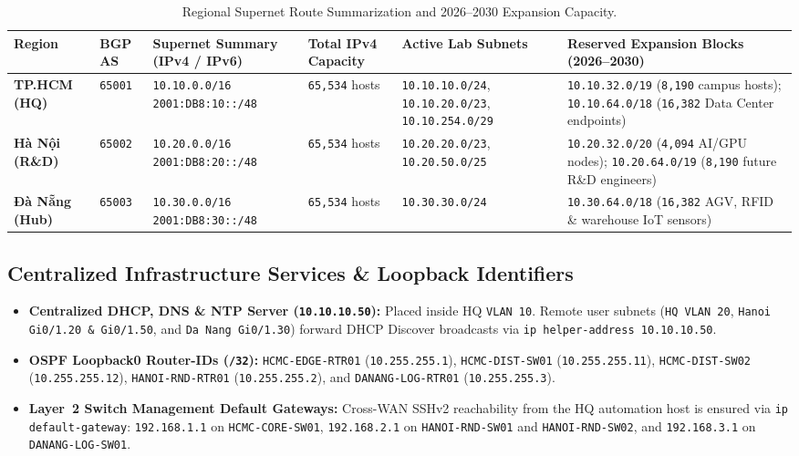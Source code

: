 \begin{table}[H]
\centering
\caption{Regional Supernet Route Summarization and 2026--2030 Expansion Capacity.}
\label{tab:supernet_scaling}
\scriptsize
\setlength{\tabcolsep}{4pt}
\begin{tabularx}{\textwidth}{|p{2.0cm}|p{1.05cm}|p{2.5cm}|p{1.25cm}|p{2.95cm}|X|}
\hline
\textbf{Region} & \textbf{BGP AS} & \textbf{Supernet Summary (IPv4 / IPv6)} & \textbf{Total IPv4 Capacity} & \textbf{Active Lab Subnets} & \textbf{Reserved Expansion Blocks (2026--2030)} \\
\hline
\textbf{TP.HCM (HQ)} & \texttt{65001} & \texttt{10.10.0.0/16} \newline \texttt{2001:DB8:10::/48} & \texttt{65,534} hosts & \texttt{10.10.10.0/24}, \texttt{10.10.20.0/23}, \texttt{10.10.254.0/29} & \texttt{10.10.32.0/19} (\texttt{8,190} campus hosts); \newline \texttt{10.10.64.0/18} (\texttt{16,382} Data Center endpoints) \\
\hline
\textbf{Hà Nội (R\&D)} & \texttt{65002} & \texttt{10.20.0.0/16} \newline \texttt{2001:DB8:20::/48} & \texttt{65,534} hosts & \texttt{10.20.20.0/23}, \texttt{10.20.50.0/25} & \texttt{10.20.32.0/20} (\texttt{4,094} AI/GPU nodes); \newline \texttt{10.20.64.0/19} (\texttt{8,190} future R\&D engineers) \\
\hline
\textbf{Đà Nẵng (Hub)} & \texttt{65003} & \texttt{10.30.0.0/16} \newline \texttt{2001:DB8:30::/48} & \texttt{65,534} hosts & \texttt{10.30.30.0/24} & \texttt{10.30.64.0/18} (\texttt{16,382} AGV, RFID \& warehouse IoT sensors) \\
\hline
\end{tabularx}
\end{table}

\subsection{Centralized Infrastructure Services \& Loopback Identifiers}
\begin{itemize}[leftmargin=1.5em, itemsep=2pt]
    \item \textbf{Centralized DHCP, DNS \& NTP Server (\texttt{10.10.10.50}):} Placed inside HQ \texttt{VLAN 10}. Remote user subnets (\texttt{HQ VLAN 20}, \texttt{Hanoi Gi0/1.20 \& Gi0/1.50}, and \texttt{Da Nang Gi0/1.30}) forward DHCP Discover broadcasts via \texttt{ip helper-address 10.10.10.50}.
    \item \textbf{OSPF Loopback0 Router-IDs (\texttt{/32}):} \texttt{HCMC-EDGE-RTR01} (\texttt{10.255.255.1}), \texttt{HCMC-DIST-SW01} (\texttt{10.255.255.11}), \texttt{HCMC-DIST-SW02} (\texttt{10.255.255.12}), \texttt{HANOI-RND-RTR01} (\texttt{10.255.255.2}), and \texttt{DANANG-LOG-RTR01} (\texttt{10.255.255.3}).
    \item \textbf{Layer~2 Switch Management Default Gateways:} Cross-WAN SSHv2 reachability from the HQ automation host is ensured via \texttt{ip default-gateway}: \texttt{192.168.1.1} on \texttt{HCMC-CORE-SW01}, \texttt{192.168.2.1} on \texttt{HANOI-RND-SW01} and \texttt{HANOI-RND-SW02}, and \texttt{192.168.3.1} on \texttt{DANANG-LOG-SW01}.
\end{itemize}
